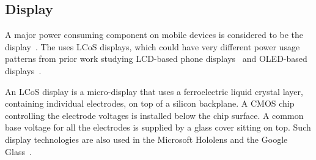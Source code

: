 
%









\subsection{Display}



A major power consuming component on mobile devices is considered to be the
display~\cite{187123,Anand:2011}. The {\mlo} uses LCoS displays, which could have very different power usage patterns from prior work studying LCD-based phone displays~\cite{Hwang:2017:RPO} and OLED-based displays~\cite{focusVR}.

An LCoS display is a micro-display that uses a ferroelectric liquid crystal 
layer, containing individual electrodes, on top of a silicon backplane. A CMOS chip controlling the electrode voltages is installed below the chip surface. A common base voltage for all the electrodes is supplied by a glass cover sitting on top. Such display technologies are also used in the Microsoft Hololens and the Google Glass~\cite{LiKamWa14GGlass}. 

